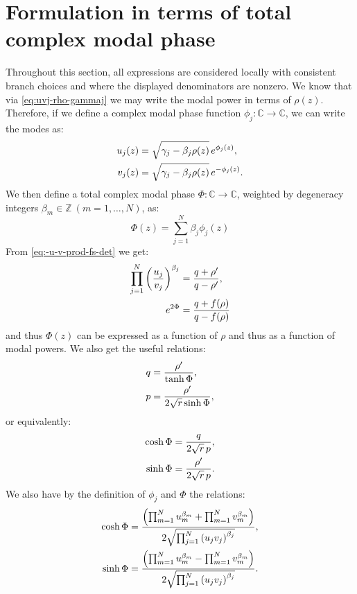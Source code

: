 \documentclass[11pt,a4paper]{article}
\numberwithin{equation}{section}
\begin{document}
\section{Formulation in terms of total complex modal phase}
\label{sec:mode-power-form}

Throughout this section, all expressions are considered locally with consistent branch choices and where the displayed denominators are nonzero.
We know that via \eqref{eq:uvj-rho-gammaj} we may write the modal power in terms of $\rho(z)$. 
Therefore, if we define a complex modal phase function $\phi_j: \mathbb{C} \to \mathbb{C}$, we can write the modes as:
\begin{align}
    u_j(z) &= \sqrt{\gamma_j - \beta_j\rho(z)}\,e^{\phi_j(z)}, \notag \\
    v_j(z) &= \sqrt{\gamma_j - \beta_j\rho(z)}\,e^{-\phi_j(z)}.
\end{align}
We then define a total complex modal phase $\Phi: \mathbb{C} \to \mathbb{C}$, weighted by degeneracy integers $\beta_m \in \mathbb{Z}\ (m=1,\dots,N)$, as:
\begin{equation}
    \Phi(z) = \sum_{j=1}^{N}\beta_j\phi_j(z)
\end{equation}
From \eqref{eq:-u-v-prod-fs-det} we get:
\begin{align}
    \prod_{j=1}^{N}\left(\frac{u_j}{v_j}\right)^{\beta_j} &= \frac{q + \rho'}{q - \rho'}, \notag \\
    e^{2\Phi} &= \frac{q + f(\rho)}{q - f(\rho)} \label{eq:Phi-q-f-rho}
\end{align}
and thus $\Phi(z)$ can be expressed as a function of $\rho$ and thus as a function of modal powers.
We also get the useful relations:
\begin{align}
    q &= \frac{\rho'}{\tanh{\Phi}}, \notag \\
    p &= \frac{\rho'}{2\sqrt{r}\sinh{\Phi}}, \label{eq:q-p-phi}
\end{align}
or equivalently:
\begin{align}
    \cosh{\Phi} &= \frac{q}{2 \sqrt{r}\,p}, \notag \\
    \sinh{\Phi} &= \frac{\rho'}{2 \sqrt{r}\,p}. \label{eq:cosh-sinh-qpr}
\end{align}
We also have by the definition of $\phi_j$ and $\Phi$ the relations:
\begin{align}
    \cosh{\Phi} &= \frac{\left(\prod_{m=1}^{N} u_{m}^{{\beta}_{m}} + \prod_{m=1}^{N} v_{m}^{{\beta}_{m}}\right)}{2\sqrt{\prod_{j=1}^{N}\left(u_jv_j\right)^{\beta_j}}}, \notag \\
    \sinh{\Phi} &= \frac{\left(\prod_{m=1}^{N} u_{m}^{{\beta}_{m}} - \prod_{m=1}^{N} v_{m}^{{\beta}_{m}}\right)}{2\sqrt{\prod_{j=1}^{N}\left(u_jv_j\right)^{\beta_j}}}. \label{eq:cosh-sinh-u-v}
\end{align}
\end{document}
